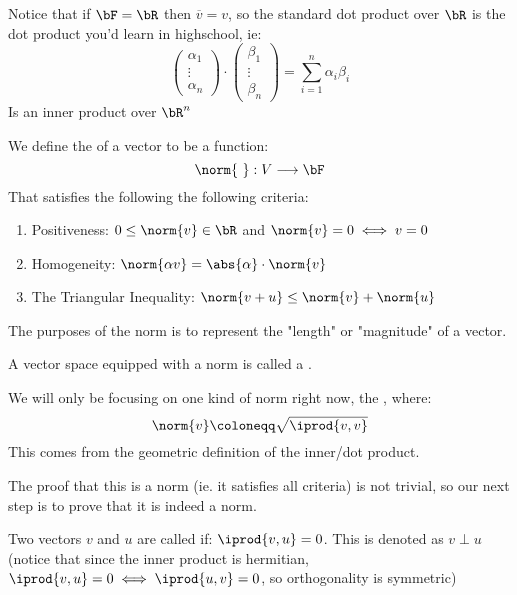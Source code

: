 \documentclass[10pt]{article}
\begin{document}
\begin{note}

Notice that if $\bF=\bR$ then $\overline{v}=v$, so the standard dot product over $\bR$ is the dot product you'd learn in highschool, ie:
\[ \begin{pmatrix} \alpha_1\\\vdots\\\alpha_n \end{pmatrix} \cdot \begin{pmatrix} \beta_1\\\vdots\\\beta_n \end{pmatrix} = \sum_{i=1}^n\alpha_i\beta_i \]
Is an inner product over $\bR^n$

\end{note}

\begin{definition}

We define the  of a vector to be a function:
\[ \norm{~} : V\longrightarrow\bF \]
That satisfies the following the following criteria:
\begin{enumerate}
    \item Positiveness: $0\leq\norm{v}\in\bR$ and $\norm{v}=0\iff v=0$
    \item Homogeneity: $\norm{\alpha v}=\abs{\alpha}\cdot\norm{v}$
    \item The Triangular Inequality: $\norm{v+u}\leq\norm{v}+\norm{u}$
\end{enumerate}

The purposes of the norm is to represent the "length" or "magnitude" of a vector.

A vector space equipped with a norm is called a .

\end{definition}

\begin{note}

We will only be focusing on one kind of norm right now, the , where:
\[ \norm{v}\coloneqq\sqrt{\iprod{v,v}} \]
This comes from the geometric definition of the inner/dot product.

The proof that this is a norm (ie. it satisfies all criteria) is not trivial, so our next step is to prove that it is indeed a norm.

\end{note}

\begin{definition}

Two vectors $v$ and $u$ are called  if: $\iprod{v,u}=0$. This is denoted as $v\perp u$ (notice that since the inner product is hermitian, $\iprod{v,u}=0\iff\iprod{u,v}=0$, so orthogonality is symmetric)

\end{definition}
\end{document}
